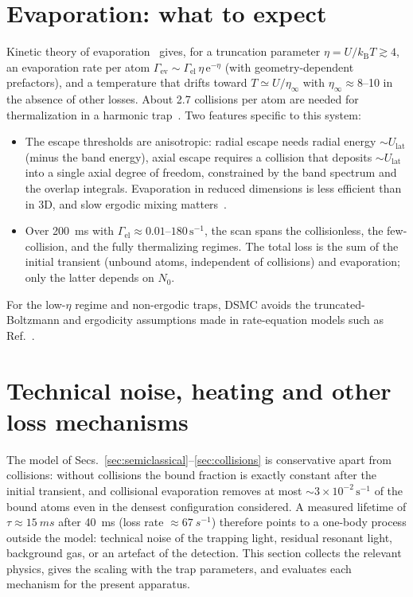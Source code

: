 \documentclass[11pt,a4paper]{article}
\newcommand{\ee}{\mathrm{e}}
\newcommand{\kB}{k_\mathrm{B}}
\newcommand{\Ulat}{U_\mathrm{lat}}
\begin{document}
\section{Evaporation: what to expect}
\label{sec:evaporation}

Kinetic theory of evaporation~\cite{Ketterle1996,Luiten1996} gives, for a truncation parameter $\eta=U/\kB T\gtrsim4$, an evaporation rate per atom $\Gamma_\mathrm{ev}\sim\Gamma_\mathrm{el}\,\eta\,\ee^{-\eta}$ (with geometry-dependent prefactors), and a temperature that drifts toward $T\simeq U/\eta_\infty$ with $\eta_\infty\approx 8$--10 in the absence of other losses. About 2.7 collisions per atom are needed for thermalization in a harmonic trap~\cite{Monroe1993}. Two features specific to this system:
\begin{itemize}[leftmargin=*]
\item The escape thresholds are anisotropic: radial escape needs radial energy $\sim\Ulat$ (minus the band energy), axial escape requires a collision that deposits $\sim\Ulat$ into a single axial degree of freedom, constrained by the band spectrum and the overlap integrals. Evaporation in reduced dimensions is less efficient than in 3D, and slow ergodic mixing matters~\cite{Surkov1996}.
\item Over \SI{200}{ms} with $\Gamma_\mathrm{el}\approx0.01$--$180\,\mathrm{s^{-1}}$, the scan spans the collisionless, the few-collision, and the fully thermalizing regimes. The total loss is the sum of the initial transient (unbound atoms, independent of collisions) and evaporation; only the latter depends on $N_0$.
\end{itemize}
For the low-$\eta$ regime and non-ergodic traps, DSMC avoids the truncated-Boltzmann and ergodicity assumptions made in rate-equation models such as Ref.~\cite{Yan2011}.

\section{Technical noise, heating and other loss mechanisms}
\label{sec:noise}

The model of Secs.~\ref{sec:semiclassical}--\ref{sec:collisions} is conservative apart from collisions: without collisions the bound fraction is exactly constant after the initial transient, and collisional evaporation removes at most $\sim\!3\times10^{-2}\,\mathrm{s^{-1}}$ of the bound atoms even in the densest configuration considered. A measured lifetime of $\tau\approx\SI{15}{ms}$ after \SI{40}{ms} (loss rate $\approx\SI{67}{s^{-1}}$) therefore points to a one-body process outside the model: technical noise of the trapping light, residual resonant light, background gas, or an artefact of the detection. This section collects the relevant physics, gives the scaling with the trap parameters, and evaluates each mechanism for the present apparatus.
\end{document}
